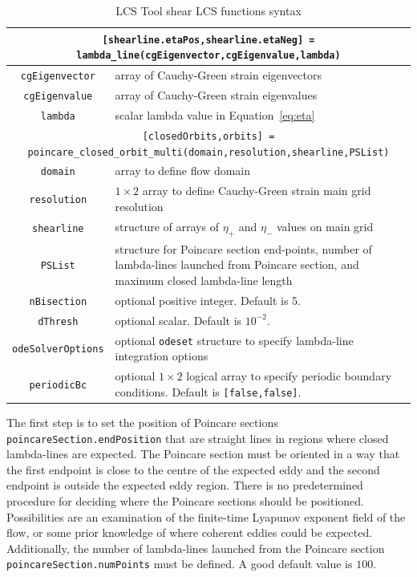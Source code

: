 \documentclass{article}
\begin{document}
\begin{table}
\begin{tabular}{|c|p{}|}
\hline \hline
\multicolumn{2}{|p{\textwidth}|}{\lstinline![shearline.etaPos,shearline.etaNeg] = lambda_line(cgEigenvector,cgEigenvalue,lambda)!}\\
\hline
\lstinline!cgEigenvector! & array of Cauchy-Green strain eigenvectors\\
\hline
\lstinline!cgEigenvalue! & array of Cauchy-Green strain eigenvalues\\
\hline
\lstinline!lambda! & scalar lambda value in Equation~\eqref{eq:eta}\\
\hline \hline
\multicolumn{2}{|p{\textwidth}|}{\lstinline![closedOrbits,orbits] = poincare_closed_orbit_multi(domain,resolution,shearline,PSList)!}\\
\hline
\lstinline!domain! & array to define flow domain\\
\hline
\lstinline!resolution! & $1 \times 2$ array to define Cauchy-Green strain main grid resolution\\
\hline
\lstinline!shearline! & structure of arrays of $\eta_+$ and $\eta_-$ values on main grid\\
\hline
\lstinline!PSList! & structure for Poincare section end-points, number of lambda-lines launched from Poincare section, and maximum closed lambda-line length\\
\hline
\lstinline!nBisection! & optional positive integer. Default is 5.\\
\hline
\lstinline!dThresh! & optional scalar. Default is $10^{-2}$.\\
\hline
\lstinline!odeSolverOptions! & optional \lstinline!odeset! structure to specify lambda-line integration options\\
\hline
\lstinline!periodicBc! & optional $1 \times 2$ logical array to specify periodic boundary conditions. Default is \lstinline![false,false]!.\\
\hline \hline
\end{tabular}
\caption{LCS Tool shear LCS functions syntax}
\label{t:Shear LCS functions}
\end{table}

The first step is to set the position of Poin\-care sections \lstinline!poincareSection.endPosition! that are straight lines in regions where closed lambda-lines are expected. The Poincare section must be oriented in a way that the first endpoint is close to the centre of the expected eddy and the second endpoint is outside the expected eddy region. There is no predetermined procedure for deciding where the Poincare sections should be positioned. Possibilities are an examination of the finite-time Lyapunov exponent field of the flow, or some prior knowledge of where coherent eddies could be expected. Additionally, the number of lambda-lines launched from the Poincare section \lstinline!poincareSection.numPoints! must be defined. A good default value is $100$.
\end{document}
